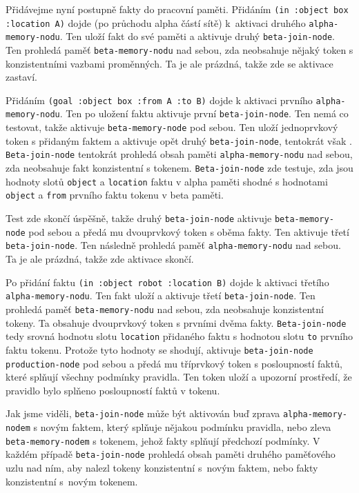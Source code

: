 Přidávejme nyní postupně fakty do pracovní paměti. Přidáním
\verb|(in :object box :location A)| dojde (po průchodu alpha částí sítě)
k~aktivaci druhého \verb|alpha-memory-nodu|. Ten uloží fakt do své paměti a
aktivuje  druhý \verb|beta-join-node|. Ten prohledá paměť
\verb|beta-memory-nodu| nad sebou, zda neobsahuje nějaký token s konzistentními
vazbami proměnných. Ta je ale prázdná, takže zde se aktivace zastaví.

Přidáním \verb|(goal :object box :from A :to B)| dojde k aktivaci prvního
\verb|alpha-memory-nodu|. Ten po uložení faktu aktivuje první
\verb|beta-join-node|. Ten nemá co testovat, takže aktivuje
\verb|beta-memory-node| pod sebou. Ten uloží jednoprvkový token s přidaným
faktem a aktivuje opět druhý \verb|beta-join-node|, tentokrát však .
\verb|Beta-join-node| tentokrát prohledá obsah paměti \verb|alpha-memory-nodu|
nad sebou, zda neobsahuje fakt konzistentní s tokenem. \verb|Beta-join-node| zde
testuje, zda jsou hodnoty slotů \verb|object| a \verb|location| faktu v alpha
paměti shodné s hodnotami \verb|object| a \verb|from| prvního faktu tokenu v
beta paměti.

Test zde skončí úspěšně, takže druhý \verb|beta-join-node| aktivuje
\verb|beta-memory-node| pod sebou a předá mu dvouprvkový token s oběma fakty.
Ten aktivuje  třetí \verb|beta-join-node|. Ten následně prohledá paměť
\verb|alpha-memory-nodu| nad sebou. Ta je ale prázdná, takže zde aktivace
skončí.

Po přidání faktu \verb|(in :object robot :location B)| dojde k aktivaci třetího
\verb|alpha-memory-nodu|. Ten fakt uloží a aktivuje  třetí
\verb|beta-join-node|. Ten prohledá paměť \verb|beta-memory-nodu| nad sebou, zda
neobsahuje konzistentní tokeny. Ta obsahuje dvouprvkový token s prvními dvěma
fakty. \verb|Beta-join-node| tedy srovná hodnotu slotu \verb|location| přidaného
faktu s hodnotou slotu \verb|to| prvního faktu tokenu. Protože tyto hodnoty se
shodují, aktivuje \verb|beta-join-node| \verb|production-node| pod sebou a předá
mu tříprvkový token s posloupností faktů, které splňují všechny podmínky
pravidla. Ten token uloží a upozorní prostředí, že pravidlo bylo splňeno
posloupností faktů v tokenu.

Jak jsme viděli, \verb|beta-join-node| může být aktivován buď zprava
\verb|alpha-memory-nodem| s novým faktem, který splňuje nějakou podmínku
pravidla, nebo zleva \verb|beta-memory-nodem| s tokenem, jehož fakty splňují
předchozí podmínky. V každém případě \verb|beta-join-node| prohledá obsah paměti
druhého paměťového uzlu nad ním, aby nalezl tokeny konzistentní s~novým faktem,
nebo fakty konzistentní s~novým tokenem.

